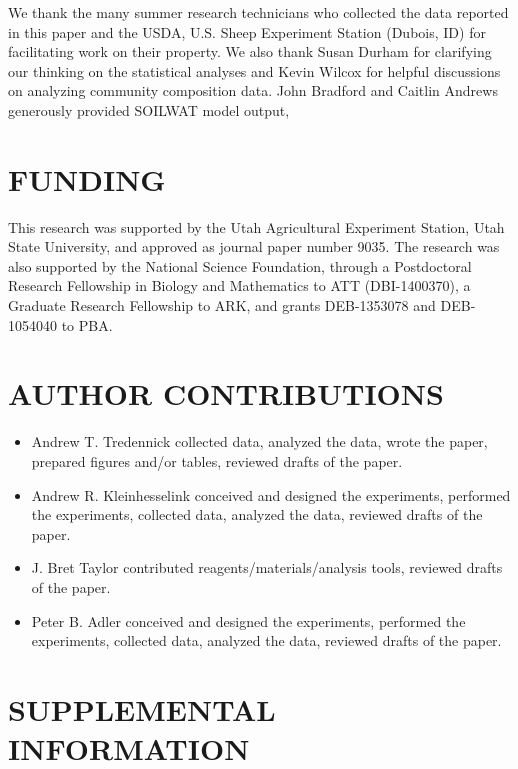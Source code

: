 \documentclass[fleqn,10pt,lineno]{wlpeerj} %
\begin{document}
We thank the many summer research technicians who collected the data
reported in this paper and the USDA, U.S. Sheep Experiment Station
(Dubois, ID) for facilitating work on their property. We also thank
Susan Durham for clarifying our thinking on the statistical analyses and
Kevin Wilcox for helpful discussions on analyzing community composition
data. John Bradford and Caitlin Andrews generously provided SOILWAT
model output,

\section{FUNDING}\label{funding}

This research was supported by the Utah Agricultural Experiment Station,
Utah State University, and approved as journal paper number 9035. The
research was also supported by the National Science Foundation, through
a Postdoctoral Research Fellowship in Biology and Mathematics to ATT
(DBI-1400370), a Graduate Research Fellowship to ARK, and grants
DEB-1353078 and DEB-1054040 to PBA.

\section{AUTHOR CONTRIBUTIONS}\label{author-contributions}

\begin{itemize}
  \item Andrew T. Tredennick collected data, analyzed the data, wrote the paper, prepared figures and/or tables, reviewed drafts of the paper.
  \item Andrew R. Kleinhesselink conceived and designed the experiments, performed the experiments, collected data, analyzed the data, reviewed drafts of the paper.
  \item J. Bret Taylor contributed reagents/materials/analysis tools, reviewed drafts of the paper.
  \item Peter B. Adler conceived and designed the experiments, performed the experiments, collected data, analyzed the data, reviewed drafts of the paper.
\end{itemize}

\section{SUPPLEMENTAL INFORMATION}\label{supplemental-information}
\end{document}
